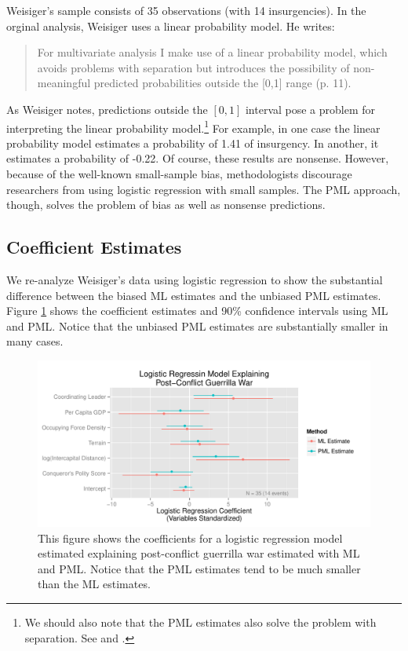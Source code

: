 \documentclass[12pt]{article}
\begin{document}
Weisiger's sample consists of 35 observations (with 14 insurgencies). In the orginal analysis, Weisiger uses a linear probability model. He writes:

\begin{quote}
For multivariate analysis I make use of a linear probability model, which avoids problems with separation but introduces the possibility of non-meaningful predicted probabilities outside the [0,1] range (p. 11).
\end{quote}

As Weisiger notes, predictions outside the $[0, 1]$ interval pose a problem for interpreting the linear probability model.\footnote{We should also note that the PML estimates also solve the problem with separation. See \cite{Zorn2005} and \cite{Rainey-separation}.} 
For example, in one case the linear probability model estimates a probability of 1.41 of insurgency. 
In another, it estimates a probability of -0.22. 
Of course, these results are nonsense. 
However, because of the well-known small-sample bias, methodologists discourage researchers from using logistic regression with small samples.
The PML approach, though, solves the problem of bias as well as nonsense predictions.

\subsection*{Coefficient Estimates}

We re-analyze Weisiger's data using logistic regression to show the substantial difference between the biased ML estimates and the unbiased PML estimates. 
Figure \ref{fig:weisiger-coefs} shows the coefficient estimates and 90\% confidence intervals using ML and PML. 
Notice that the unbiased PML estimates are substantially smaller in many cases.

\begin{figure}[H]
\begin{center}
\includegraphics[width = \textwidth]{figs/weisiger-coefs.pdf}
\caption{This figure shows the coefficients for a logistic regression model estimated explaining post-conflict guerrilla war estimated with ML and PML. 
Notice that the PML estimates tend to be much smaller than the ML estimates.}\label{fig:weisiger-coefs}
\end{center}
\end{figure}
\end{document}
